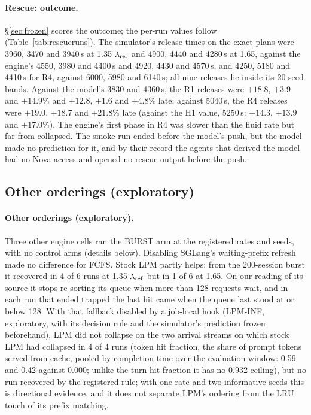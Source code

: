 \paragraph{Rescue: outcome.} \S\ref{sec:frozen} scores the outcome; the per-run values follow (Table~\ref{tab:rescueruns}). The simulator's release times on the exact plans were 3960, 3470 and 3940\,s at 1.35 $\lambda_{\mathrm{ref}}$ and 4900, 4440 and 4280\,s at 1.65, against the engine's 4550, 3980 and 4400\,s and 4920, 4430 and 4570\,s, and 4250, 5180 and 4410\,s for R4, against 6000, 5980 and 6140\,s; all nine releases lie inside its 20-seed bands. Against the model's 3830 and 4360\,s, the R1 releases were $+18.8$, $+3.9$ and $+14.9\%$ and $+12.8$, $+1.6$ and $+4.8\%$ late; against 5040\,s, the R4 releases were $+19.0$, $+18.7$ and $+21.8\%$ late (against the H1 value, 5250\,s: $+14.3$, $+13.9$ and $+17.0\%$). The engine's first phase in R4 was slower than the fluid rate but far from collapsed. The smoke run ended before the model's push, but the model made no prediction for it, and by their record the agents that derived the model had no Nova access and opened no rescue output before the push.

\subsection{Other orderings (exploratory)}\label{app:grid}

\paragraph{Other orderings (exploratory).}\label{sec:grid}
Three other engine cells ran the BURST arm at the registered rates and seeds, with no control arms (details below). Disabling SGLang's waiting-prefix refresh made no difference for FCFS. Stock LPM partly helps: from the 200-session burst it recovered in 4 of 6 runs at 1.35 $\lambda_{\mathrm{ref}}$ but in 1 of 6 at 1.65. On our reading of its source it stops re-sorting its queue when more than 128 requests wait, and in each run that ended trapped the last hit came when the queue last stood at or below 128. With that fallback disabled by a job-local hook (LPM-INF, exploratory, with its decision rule and the simulator's prediction frozen beforehand), LPM did not collapse on the two arrival streams on which stock LPM had collapsed in 4 of 4 runs (token hit fraction, the share of prompt tokens served from cache, pooled by completion time over the evaluation window: 0.59 and 0.42 against 0.000; unlike the turn hit fraction it has no 0.932 ceiling), but no run recovered by the registered rule; with one rate and two informative seeds this is directional evidence, and it does not separate LPM's ordering from the LRU touch of its prefix matching.

